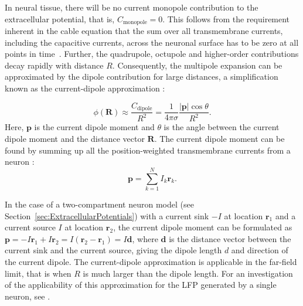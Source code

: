 \documentclass[preprint,11pt,authoryear]{elsarticle}
\newcommand{\hlR}[2][red]{ {\sethlcolor{#1} \hl{#2}} }
\newcommand{\hlp}[2][Purple]{ {\sethlcolor{#1} \hl{#2}} }
\newcommand{\gen}[1]{\color{white}{\hlR{GTE: #1 }}\color{black}}
\newcommand{\snnote}[1]{\color{white}{\hlp{SN: #1 }}\color{black}}
\begin{document}
In neural tissue, there will be no current monopole contribution to the extracellular potential,  
that is, $C_\text{monopole}=0$. This follows from the requirement inherent in the cable equation that the sum over all transmembrane currents, including the capacitive currents, across the neuronal surface has to be zero at all points in time~\citep{Pettersen2012}.
Further,
the quadrupole, octupole and higher-order contributions decay rapidly with distance $R$. Consequently, the multipole expansion can be approximated by the dipole contribution for large distances, a simplification known as the current-dipole approximation \citep{Nunez2006}:

\begin{equation}\label{eq:CDA}
\phi(\mathbf{R}) \approx \frac{C_\text{dipole}}{R^2} = \frac{1}{4 \pi \sigma} \frac{|\mathbf{p}| \cos \theta}{R^2}.
\end{equation}
Here, $\mathbf{p}$ is the current dipole moment and $\theta$ is the angle between the current dipole moment and the distance vector $\mathbf{R}$. The current dipole moment can be found by summing up all the position-weighted transmembrane currents from a neuron \citep{Pettersen2008, Pettersen2014, Nunez2006}: 
\begin{equation}\label{eq:dipole}
\mathbf{p} = \sum_{k=1}^N I_k \mathbf{r}_k.
\end{equation}

In the case of a two-compartment neuron model (see Section~\ref{sec:ExtracellularPotentials}) with a current sink $-I$ at location $\mathbf{r}_1$ and a current source $I$ at location $\mathbf{r}_2$, the current dipole moment can be formulated as $\mathbf{p} = -I\mathbf{r}_1 + I\mathbf{r}_2 = I(\mathbf{r}_2 - \mathbf{r}_1) = I\mathbf{d}$, where $\mathbf{d}$ is the distance vector between the current sink and the current source, giving the dipole length $d$ and direction of the current dipole. The current-dipole approximation is applicable in the far-field limit, that is when $R$ is much larger than the dipole length. For an investigation of the applicability of this approximation for the LFP generated by a single neuron, 
see \cite{Linden2010}.

\
\end{document}
